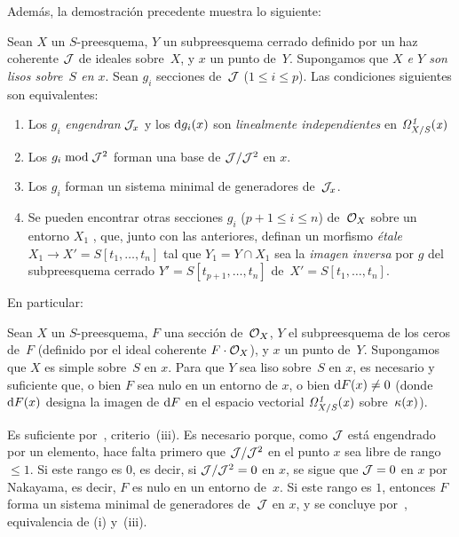 Además, la demostración precedente muestra lo siguiente:
\begin{corollaire}
\label{II.4.11}
Sean $X$ un $S$-preesquema, $Y$ un subpreesquema cerrado definido por un haz coherente $\cal{J}$ de ideales sobre~$X$, y $x$ un punto de~$Y$. Supongamos que \emph{$X$ e $Y$ son lisos sobre~$S$ en $x$}. Sean $g_i$ secciones de~$\cal{J}$ ($1\leq i\leq p$). Las condiciones siguientes son equivalentes:
\begin{enumerate}
\item[(i)] Los $g_i$ \emph{engendran} $\cal{J}_x$ y los $\rd g_i(x)$ son \emph{linealmente independientes} en $\it{\Omega}^1_{X/S}(x)$
\item[(ii)] Los $g_i\bmod\cal{J}^2$ forman una base de $\cal{J}/\cal{J}^2$ en $x$.
\item[(iii)] Los $g_i$ forman un sistema minimal de generadores de~$\cal{J}_x$.
\item[(iv)] Se pueden encontrar otras secciones $g_i$ ($p+1\leq i\leq n$) de~$\cal{O}_X$ sobre un entorno $X_1$
,
que, junto con las anteriores, definan un morfismo \emph{étale} $X_1\to X'=S[t_1,\dots,t_n]$ tal que $Y_1=Y\cap X_1$ sea la \emph{imagen inversa} por $g$ del subpreesquema cerrado $Y'=S[t_{p+1},\dots,t_n]$ de~$X'=S[t_1,\dots,t_n]$.
\end{enumerate}
\end{corollaire}

En
particular:

\begin{corollaire}
\label{II.4.12}
Sean $X$ un $S$-preesquema, $F$ una sección de~$\cal{O}_X$, $Y$ el subpreesquema de los ceros de~$F$ (definido por el ideal coherente $F\cdot\cal{O}_X$), y $x$ un punto de~$Y$. Supongamos que $X$ es simple sobre~$S$ en $x$. Para que $Y$ sea liso sobre~$S$ en $x$, es necesario y suficiente que, o bien $F$ sea nulo en un entorno de $x$, o bien $\rd F(x)\neq0$ (donde $\rd F(x)$ designa la imagen de $\rd F$ en el espacio vectorial $\it{\Omega}^1_{X/S}(x)$ sobre~$\kres(x)$).
\end{corollaire}

Es suficiente por~, criterio~(iii). Es necesario porque, como $\cal{J}$ está engendrado por un elemento, hace falta primero que $\cal{J}/\cal{J}^2$ en el punto $x$ sea libre de rango $\leq1$. Si este rango es $0$, es decir, si $\cal{J}/\cal{J}^2=0$ en $x$, se sigue que $\cal{J}=0$ en $x$ por Nakayama, es decir, $F$ es nulo en un entorno de~$x$. Si este rango es $1$, entonces $F$ forma un sistema minimal de generadores de~$\cal{J}$ en $x$, y se concluye por~, equivalencia de (i) y~(iii).

